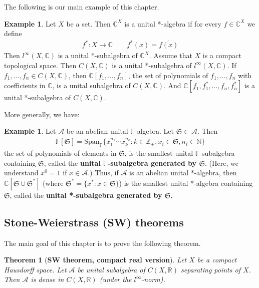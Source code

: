 \documentclass[12pt,b5paper,notitlepage]{article}
\theoremstyle{definition}
\newtheorem{eg}[df]{Example}
\theoremstyle{plain}
\newtheorem{thm}[df]{Theorem}
\newcommand{\fk}{\mathfrak}
\newcommand{\ovl}{\overline}
\newcommand{\Span}{\mathrm{Span}}
\newcommand{\scr}{\mathscr}
\newcommand{\Cbb}{\mathbb C}
\newcommand{\Nbb}{\mathbb N}
\newcommand{\Zbb}{\mathbb Z}
\newcommand{\Rbb}{\mathbb R}
\newcommand{\Fbb}{\mathbb F}
\numberwithin{equation}{section}
\begin{document}
The following is our main example of this chapter.
\begin{eg}
Let $X$ be a set. Then $\Cbb^X$ is a unital *-algebra if for every $f\in\Cbb^X$ we define \index{f@$f^*(x)=\ovl{f(x)}$}
\begin{align}
f^*:X\rightarrow\Cbb\qquad f^*(x)=\ovl{f(x)}
\end{align}
Then $l^\infty(X,\Cbb)$ is a unital *-subalgebra of $\Cbb^X$. Assume that $X$ is a compact topological space. Then $C(X,\Cbb)$ is a unital *-subalgebra of $l^\infty(X,\Cbb)$. If $f_1,\dots,f_n\in C(X,\Cbb)$, then $\Cbb[f_1,\dots,f_n]$, the set of polynomials of $f_1,\dots,f_n$ with coefficients in $\Cbb$, is a unital subalgebra of $C(X,\Cbb)$. And $\Cbb[f_1,f_1^*,\dots,f_n,f_n^*]$ is a unital *-subalgebra of $C(X,\Cbb)$.
\end{eg}


More generally, we have:

\begin{eg}
Let $\scr A$ be an abelian unital $\Fbb$-algebra. Let $\fk S\subset\scr A$. Then \index{FS@$\Fbb[\fk S]$}
\begin{align}
\Fbb[\fk S]=\Span_\Fbb\{x_1^{n_1}\cdots x_k^{n_k}:k\in\Zbb_+,x_i\in\fk S,n_i\in\Nbb\}
\end{align}
the set of polynomials of elements in $\fk S$, is the smallest unital $\Fbb$-subalgebra containing $\fk S$, called the \textbf{unital $\Fbb$-subalgebra generated by $\fk S$}.  (Here, we understand $x^0=1$ if $x\in\scr A$.) Thus, if $\scr A$ is an abelian unital *-algebra, then $\Cbb[\fk S\cup\fk S^*]$ (where $\fk S^*=\{x^*:x\in\fk S\}$) is the smallest unital *-algebra containing $\fk S$, called the \textbf{unital *-subalgebra generated by $\fk S$}.
\end{eg}



\subsection{Stone-Weierstrass (SW) theorems} 




The main goal of this chapter is to prove the following theorem.

\begin{thm}[\textbf{SW theorem, compact real version}]\label{lb442}
Let $X$ be a compact Hausdorff space. Let $\scr A$ be unital subalgebra of $C(X,\Rbb)$ separating points of $X$. Then $\scr A$ is dense in $C(X,\Rbb)$ (under the $l^\infty$-norm).
\end{thm}
\end{document}
